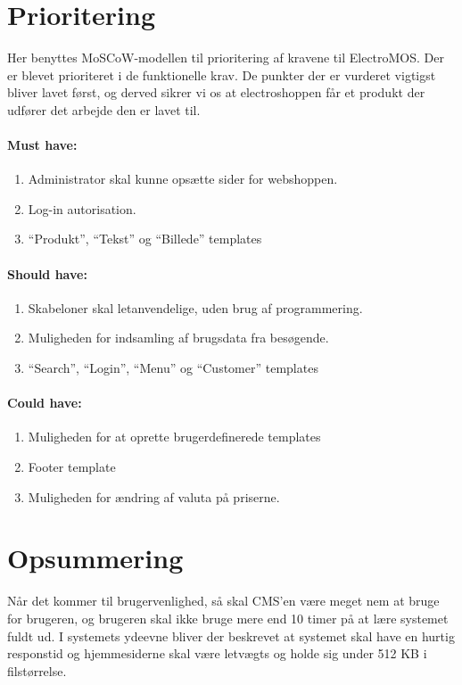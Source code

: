 \section{Prioritering}
Her benyttes MoSCoW-modellen til prioritering af kravene til ElectroMOS. Der er blevet prioriteret i de funktionelle krav. De punkter der er vurderet vigtigst bliver lavet først, og derved sikrer vi os at electroshoppen får et produkt der udfører det arbejde den er lavet til.

\paragraph{Must have:}
	\begin{enumerate}
	\item Administrator skal kunne opsætte sider for webshoppen.
    \item Log-in autorisation.
    \item “Produkt”, “Tekst” og “Billede” templates
	\end{enumerate}
\paragraph{Should have:}
	\begin{enumerate}
	\item Skabeloner skal letanvendelige, uden brug af programmering.
    \item Muligheden for indsamling af brugsdata fra besøgende.
    \item “Search”, “Login”, “Menu” og “Customer” templates
	\end{enumerate}
\paragraph{Could have:}
	\begin{enumerate}
	\item Muligheden for at oprette brugerdefinerede templates
    \item Footer template
    \item Muligheden for ændring af valuta på priserne.
	\end{enumerate}
    
\section{Opsummering}
Når det kommer til brugervenlighed, så skal CMS’en være meget nem at bruge for brugeren, og brugeren skal ikke bruge mere end 10 timer på at lære systemet fuldt ud. I systemets ydeevne bliver der beskrevet at systemet skal have en hurtig responstid og hjemmesiderne skal være letvægts og holde sig under 512 KB i filstørrelse. 
 
